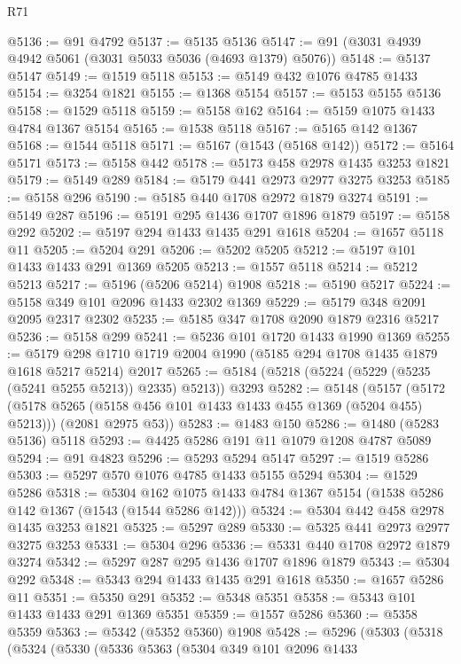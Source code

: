 \begin{lexlean}{R71}
\begin{coremodule}
@5136 := @91 @4792
@5137 := @5135 @5136
@5147 := @91 (@3031 @4939 @4942 @5061 (@3031 @5033 @5036 (@4693 @1379) @5076))
@5148 := @5137 @5147
@5149 := @1519 @5118
@5153 := @5149 @432 @1076 @4785 @1433
@5154 := @3254 @1821
@5155 := @1368 @5154
@5157 := @5153 @5155 @5136
@5158 := @1529 @5118
@5159 := @5158 @162
@5164 := @5159 @1075 @1433 @4784 @1367 @5154
@5165 := @1538 @5118
@5167 := @5165 @142 @1367
@5168 := @1544 @5118
@5171 := @5167 (@1543 (@5168 @142))
@5172 := @5164 @5171
@5173 := @5158 @442
@5178 := @5173 @458 @2978 @1435 @3253 @1821
@5179 := @5149 @289
@5184 := @5179 @441 @2973 @2977 @3275 @3253
@5185 := @5158 @296
@5190 := @5185 @440 @1708 @2972 @1879 @3274
@5191 := @5149 @287
@5196 := @5191 @295 @1436 @1707 @1896 @1879
@5197 := @5158 @292
@5202 := @5197 @294 @1433 @1435 @291 @1618
@5204 := @1657 @5118 @11
@5205 := @5204 @291
@5206 := @5202 @5205
@5212 := @5197 @101 @1433 @1433 @291 @1369 @5205
@5213 := @1557 @5118
@5214 := @5212 @5213
@5217 := @5196 (@5206 @5214) @1908
@5218 := @5190 @5217
@5224 := @5158 @349 @101 @2096 @1433 @2302 @1369
@5229 := @5179 @348 @2091 @2095 @2317 @2302
@5235 := @5185 @347 @1708 @2090 @1879 @2316 @5217
@5236 := @5158 @299
@5241 := @5236 @101 @1720 @1433 @1990 @1369
@5255 := @5179 @298 @1710 @1719 @2004 @1990 (@5185 @294 @1708 @1435 @1879 @1618 @5217 @5214) @2017
@5265 := @5184 (@5218 (@5224 (@5229 (@5235 (@5241 @5255 @5213)) @2335) @5213)) @3293
@5282 := @5148
    (@5157
      (@5172 (@5178 @5265 (@5158 @456 @101 @1433 @1433 @455 @1369 (@5204 @455) @5213)))
      (@2081 @2975 @53))
@5283 := @1483 @150
@5286 := @1480 (@5283 @5136) @5118
@5293 := @4425 @5286 @191 @11 @1079 @1208 @4787 @5089
@5294 := @91 @4823
@5296 := @5293 @5294 @5147
@5297 := @1519 @5286
@5303 := @5297 @570 @1076 @4785 @1433 @5155 @5294
@5304 := @1529 @5286
@5318 := @5304
    @162
    @1075
    @1433
    @4784
    @1367
    @5154
    (@1538 @5286 @142 @1367 (@1543 (@1544 @5286 @142)))
@5324 := @5304 @442 @458 @2978 @1435 @3253 @1821
@5325 := @5297 @289
@5330 := @5325 @441 @2973 @2977 @3275 @3253
@5331 := @5304 @296
@5336 := @5331 @440 @1708 @2972 @1879 @3274
@5342 := @5297 @287 @295 @1436 @1707 @1896 @1879
@5343 := @5304 @292
@5348 := @5343 @294 @1433 @1435 @291 @1618
@5350 := @1657 @5286 @11
@5351 := @5350 @291
@5352 := @5348 @5351
@5358 := @5343 @101 @1433 @1433 @291 @1369 @5351
@5359 := @1557 @5286
@5360 := @5358 @5359
@5363 := @5342 (@5352 @5360) @1908
@5428 := @5296
    (@5303
      (@5318
        (@5324
          (@5330
            (@5336
              @5363
              (@5304
                @349
                @101
                @2096
                @1433

\end{coremodule}
\end{lexlean}
